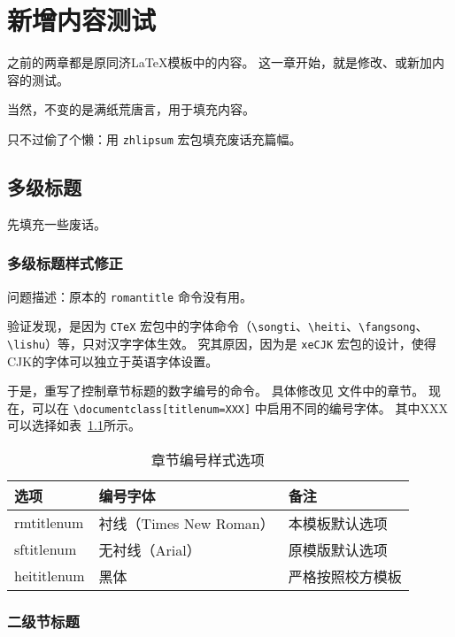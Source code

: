 \documentclass[../Main/thesis]{subfiles}
\begin{document}
\chapter{新增内容测试}
\label{cha:new}

之前的两章都是原同济LaTeX模板中的内容。
这一章开始，就是修改、或新加内容的测试\cite{mohrssBIM}。

当然，不变的是满纸荒唐言，用于填充内容\cite{HowDigital}。

只不过偷了个懒：用 \verb|zhlipsum| 宏包填充废话充篇幅。

\section{多级标题} \label{sec:seclv}

先填充一些废话。\zhlipsum[4]

\subsection{多级标题样式修正}
\label{ssc:titles-style}

问题描述：原本的 \verb|romantitle| 命令没有用。

验证发现，是因为 \verb|CTeX| 宏包中的字体命令（\verb|\songti|、\verb|\heiti|、\verb|\fangsong|、\verb|\lishu|）等，只对汉字字体生效。
究其原因，因为是 \verb|xeCJK| 宏包的设计，使得CJK的字体可以独立于英语字体设置。

于是，重写了控制章节标题的数字编号的命令。
具体修改见  文件中的章节。
现在，可以在 \texttt{\textbackslash documentclass[titlenum=XXX]} 中启用不同的编号字体。
其中XXX可以选择如表~\ref{tab:title-number-format}所示。

\begin{table}[htbp]
\centering
\caption{\tongjithesis 章节编号样式选项}
\label{tab:title-number-format}
\begin{tabular}[c]{>{\ttfamily}lll}
  \toprule[1.5pt]
  选项 & 编号字体 & 备注 \\ %
  \midrule[1pt]
  rmtitlenum & 衬线（Times New Roman） & 本模板默认选项 \\
  sftitlenum & 无衬线（Arial） & 原模版默认选项 \\
  heititlenum & 黑体 & 严格按照校方模板 \\
  \bottomrule[1.5pt]
\end{tabular}
\end{table}

\subsection{二级节标题} \label{ssc:subsec2}
\end{document}
